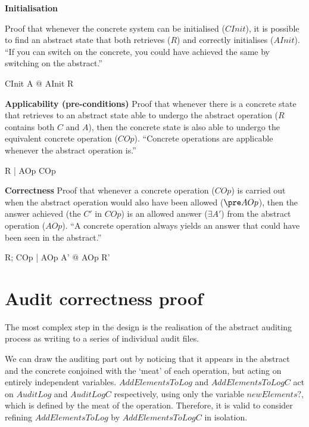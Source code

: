 {\bf Initialisation}

Proof that whenever the concrete system can be initialised
($CInit$), it is possible to find an abstract state that both retrieves ($R$)
and correctly initialises ($AInit$).
``If you can switch on the concrete,
you could have achieved the same by switching on the abstract.''
\begin{argue}
	CInit \shows \exists A @ AInit \land R
\end{argue}

{\bf Applicability (pre-conditions)}
Proof that whenever there is a concrete state that retrieves to an abstract state
able to undergo the abstract operation ($R$ contains both $C$ and $A$),
then the concrete state is also able to undergo the equivalent concrete operation ($COp$).
``Concrete operations are applicable whenever the abstract operation is.''
\begin{argue}
	R | \pre AOp \shows \pre COp
\end{argue}

{\bf Correctness}
Proof that whenever a concrete operation ($COp$) is carried out when the abstract operation
would also have been allowed ($\pre AOp$),
then the answer achieved (the $C'$ in $COp$) is an allowed answer ($\exists A'$)
from the abstract operation ($AOp$).
``A concrete operation always yields an answer that could have been seen in the abstract.''
\begin{argue}
	R; COp | \pre AOp \shows \exists A' @ AOp \land R'
\end{argue}


\section{Audit correctness proof}
\label{refine:corr}
The most complex step in the design is the realisation of the abstract
auditing process as writing to a series of individual audit files.

We can draw the auditing part out by noticing
that it appears in the abstract and the concrete conjoined with the `meat' of each operation,
but acting on entirely independent variables.
$AddElementsToLog$ and $AddElementsToLogC$ act on $AuditLog$ and $AuditLogC$ respectively,
using only the variable $newElements?$,
which is defined by the meat of the operation.
Therefore, it is valid to consider refining $AddElementsToLog$ by $AddElementsToLogC$ in isolation.

